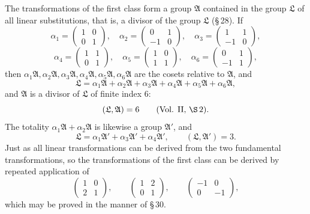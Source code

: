 \documentclass[11pt]{article}
\begin{document}
The transformations of the first class form a group $\mathfrak A$ contained in the group $\mathfrak L$ of all linear substitutions, that is, a divisor of the group $\mathfrak L$ (\S\,28). If
\[
\alpha_1=\begin{pmatrix}1&0\\0&1\end{pmatrix},\quad
\alpha_2=\begin{pmatrix}0&1\\-1&0\end{pmatrix},\quad
\alpha_3=\begin{pmatrix}1&1\\-1&0\end{pmatrix},
\]
\[
\alpha_4=\begin{pmatrix}1&1\\0&1\end{pmatrix},\quad
\alpha_5=\begin{pmatrix}1&0\\1&1\end{pmatrix},\quad
\alpha_6=\begin{pmatrix}0&1\\-1&1\end{pmatrix},
\]
then $\alpha_1\mathfrak A,\alpha_2\mathfrak A,\alpha_3\mathfrak A,\alpha_4\mathfrak A,\alpha_5\mathfrak A,\alpha_6\mathfrak A$ are the cosets relative to $\mathfrak A$, and
\[
\mathfrak L=\alpha_1\mathfrak A+\alpha_2\mathfrak A+\alpha_3\mathfrak A+\alpha_4\mathfrak A+\alpha_5\mathfrak A+\alpha_6\mathfrak A,
\]
and $\mathfrak A$ is a divisor of $\mathfrak L$ of finite index $6$:
\[
(\mathfrak L,\mathfrak A)=6\qquad(\text{Vol. II, }\S\,2).
\]
The totality $\alpha_1\mathfrak A+\alpha_2\mathfrak A$ is likewise a group $\mathfrak A'$, and
\[
\mathfrak L=\alpha_1\mathfrak A'+\alpha_3\mathfrak A'+\alpha_4\mathfrak A',
\qquad (\mathfrak L,\mathfrak A')=3.
\]
Just as all linear transformations can be derived from the two fundamental transformations, so the transformations of the first class can be derived by repeated application of
\[
\begin{pmatrix}1&0\\2&1\end{pmatrix},
\qquad
\begin{pmatrix}1&2\\0&1\end{pmatrix},
\qquad
\begin{pmatrix}-1&0\\0&-1\end{pmatrix},
\]
which may be proved in the manner of \S\,30.
\end{document}
